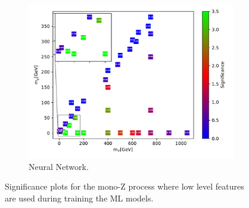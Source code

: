 \begin{figure}[H]
    \begin{subfigure}[t!]{0.49\textwidth}
    \includegraphics[width = \textwidth]{Figures/Significances/significance_NN_monoZ_Low_level.pdf}
    \caption{Neural Network.}
        \label{fig:signLowmonoZNN}
    \end{subfigure}
    \caption{Significance plots for the mono-Z process where low level features are used during training the ML models.}
    \label{fig:signLowmonoZ}
\end{figure}

